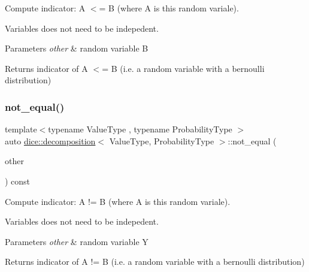 Compute indicator\+: A $<$= B (where A is this random variale). 

Variables does not need to be indepedent.


\begin{DoxyParams}{Parameters}
{\em other} & random variable B\\
\hline
\end{DoxyParams}
\begin{DoxyReturn}{Returns}
indicator of A $<$= B (i.\+e. a random variable with a bernoulli distribution) 
\end{DoxyReturn}
\mbox{\label{classdice_1_1decomposition_a648709e5232534308779c489bc985cc9}} 
\subsubsection{\texorpdfstring{not\+\_\+equal()}{not\_equal()}}
{\footnotesize\ttfamily template$<$typename Value\+Type , typename Probability\+Type $>$ \\
auto \mbox{\hyperlink{classdice_1_1decomposition}{dice\+::decomposition}}$<$ Value\+Type, Probability\+Type $>$\+::not\+\_\+equal (\begin{DoxyParamCaption}\item[{const \mbox{\hyperlink{classdice_1_1decomposition}{decomposition}}$<$ Value\+Type, Probability\+Type $>$ \&}]{other }\end{DoxyParamCaption}) const\hspace{0.3cm}{\ttfamily [inline]}}



Compute indicator\+: A != B (where A is this random variale). 

Variables does not need to be indepedent.


\begin{DoxyParams}{Parameters}
{\em other} & random variable Y\\
\hline
\end{DoxyParams}
\begin{DoxyReturn}{Returns}
indicator of A != B (i.\+e. a random variable with a bernoulli distribution) 
\end{DoxyReturn}
\mbox{\label{classdice_1_1decomposition_ad9621b64c8ff2679a5a5df4e30561c31}} 

